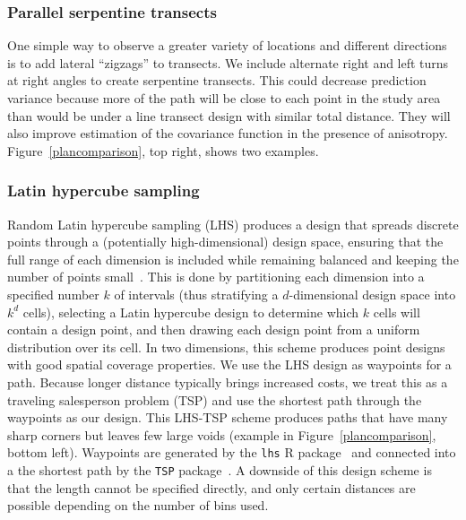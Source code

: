 \documentclass[review]{elsarticle}
\begin{document}
\subsubsection{Parallel serpentine transects}

One simple way to observe a greater variety of locations and different
directions is to add lateral ``zigzags'' to transects. We include alternate
right and left turns at right angles to create serpentine transects. This could
decrease prediction variance because more of the path will be close to each
point in the study area than would be under a line transect design with similar
total distance. They will also improve estimation of the covariance function
in the presence of anisotropy. Figure~\ref{plancomparison}, top right, shows
two examples.



\subsubsection{Latin hypercube sampling}

Random Latin hypercube sampling (LHS) produces a design that spreads discrete
points through a (potentially high-dimensional) design space, ensuring that
the full range of each dimension is included while remaining balanced and
keeping the number of points small~\citep{mckayetal}. This is done by
partitioning each dimension into a specified number \(k\) of intervals (thus
stratifying a \(d\)-dimensional design space into \(k^{d}\) cells), selecting
a Latin hypercube design to determine which \(k\) cells will contain a design
point, and then drawing each design point from a uniform distribution over its
cell. In two dimensions, this scheme produces point designs with good spatial
coverage properties. We use the LHS design as waypoints for a path. Because
longer distance typically brings increased costs, we treat this as a traveling
salesperson problem (TSP) and use the shortest path through the waypoints as
our design. This LHS-TSP scheme produces paths that have many sharp corners but
leaves few large voids (example in Figure~\ref{plancomparison}, bottom left).
Waypoints are generated by the \texttt{lhs} R package~\cite{lhs} and connected
into a the shortest path by the \texttt{TSP} package~\citep{tsp}. A downside of
this design scheme is that the length cannot be specified directly, and only
certain distances are possible depending on the number of bins used.
\end{document}
